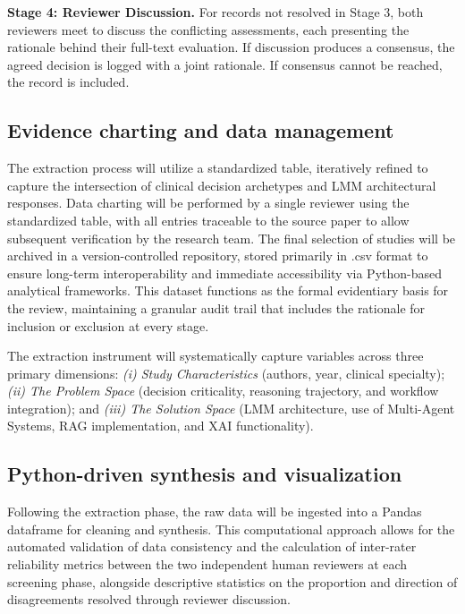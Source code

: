 \documentclass[review,12pt]{elsarticle}
\begin{document}
\textbf{Stage 4: Reviewer Discussion.} For records not resolved in Stage 3, both reviewers meet to discuss the conflicting assessments, each presenting the rationale behind their full-text evaluation. If discussion produces a consensus, the agreed decision is logged with a joint rationale. If consensus cannot be reached, the record is included.


\subsection{Evidence charting and data management}

The extraction process will utilize a standardized table, iteratively refined to capture the intersection of clinical decision archetypes and LMM architectural responses.  Data charting will be performed by a single reviewer using the standardized table, with all entries traceable to the source paper to allow subsequent verification by the research team. The final selection of studies will be archived in a version-controlled repository, stored primarily in .csv format to ensure long-term interoperability and immediate accessibility via Python-based analytical frameworks. This dataset functions as the formal evidentiary basis for the review, maintaining a granular audit trail that includes the rationale for inclusion or exclusion at every stage.

The extraction instrument will systematically capture variables across three primary dimensions:
\textit{(i) Study Characteristics} (authors, year, clinical specialty);
\textit{(ii) The Problem Space} (decision criticality, reasoning trajectory, and workflow integration); and
\textit{(iii) The Solution Space} (LMM architecture, use of Multi-Agent Systems, RAG implementation, and XAI functionality).

\subsection{Python-driven synthesis and visualization}

Following the extraction phase, the raw data will be ingested into a Pandas dataframe for cleaning and synthesis. This computational approach allows for the automated validation of data consistency and  the calculation of inter-rater reliability metrics between the two independent human reviewers at each screening phase, alongside descriptive statistics on the proportion and direction of disagreements resolved through reviewer discussion.
\end{document}
